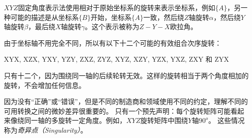
$XYZ$固定角度表示法使用相对于原始坐标系的旋转来表示坐标系，例如$\{A\}$，另一种可能的描述是从坐标系$\{B\}$开始，坐标系$\{A\}$一致，然后绕$Z$轴旋转$\alpha$，然后绕$Y$轴旋转$\beta$，最后绕$X$轴旋转$\gamma$。这个表示被称为$Z-Y-X$欧拉角。


由于坐标轴不用完全不同，所以有以下十二个可能的有效组合次序旋转：

\begin{center}
XYX, XZX, YXY, YZY, ZXZ, ZYZ, XYZ, XZY, YZX, YXZ, ZXY 和 ZYX
\end{center}

只有十二个，因为围绕同一轴的后续轮转无效。这样的旋转相当于两个角度相加的旋转，不会增加任何信息。


因为没有“正确”或“错误”，但是不同的制造商和领域使用不同的约定，理解不同的可用转换之间的微妙差异很重要的。 只有一个预先声明：每个旋转矩阵可能看起来像绕同一轴的多旋转一定角度。例如，$XYZ$旋转矩阵中围绕$Y$轴$90^o$。 这些情况称为\emph{奇异点（Singularity）}。


